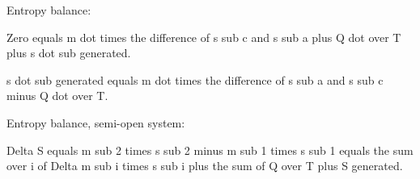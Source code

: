 Entropy balance:

Zero equals m dot times the difference of s sub c and s sub a plus Q dot over T plus s dot sub generated.

s dot sub generated equals m dot times the difference of s sub a and s sub c minus Q dot over T.

Entropy balance, semi-open system:

Delta S equals m sub 2 times s sub 2 minus m sub 1 times s sub 1 equals the sum over i of Delta m sub i times s sub i plus the sum of Q over T plus S generated.